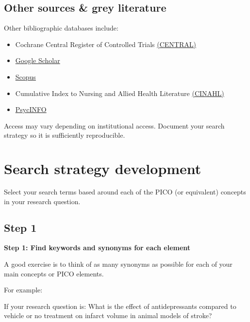 \documentclass[
]{book}
\providecommand{\tightlist}{%
  \setlength{\itemsep}{0pt}\setlength{\parskip}{0pt}}
\begin{document}
\hypertarget{other-sources-grey-literature}{%
\subsection{Other sources \& grey literature}\label{other-sources-grey-literature}}

Other bibliographic databases include:

\begin{itemize}
\tightlist
\item
  Cochrane Central Register of Controlled Trials \href{https://www.cochranelibrary.com/central/about-central}{(CENTRAL)}
\item
  \href{https://scholar.google.com/}{Google Scholar}
\item
  \href{https://www.scopus.com/home.uri}{Scopus}
\item
  Cumulative Index to Nursing and Allied Health Literature \href{https://www.ebscohost.com/nursing/products/cinahl-databases/cinahl-complete}{(CINAHL)}
\item
  \href{https://www.apa.org/pubs/databases/psycinfo}{PsycINFO}
\end{itemize}

Access may vary depending on institutional access. Document your search strategy so it is sufficiently reproducible.

\hypertarget{search-strategy-development}{%
\section{Search strategy development}\label{search-strategy-development}}

Select your search terms based around each of the PICO (or equivalent) concepts in your research question.

\hypertarget{step-1}{%
\subsection{Step 1}\label{step-1}}

\textbf{Step 1: Find keywords and synonyms for each element}

A good exercise is to think of as many synonyms as possible for each of your main concepts or PICO elements.

For example:

If your research question is: What is the effect of antidepressants compared to vehicle or no treatment on infarct volume in animal models of stroke?
\end{document}
